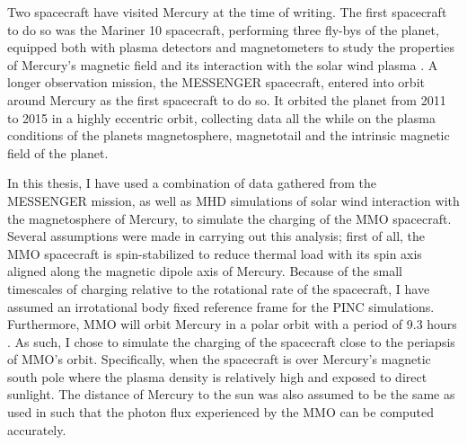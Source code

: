Two spacecraft have visited Mercury at the time of writing. The first spacecraft to do so was the Mariner 10 spacecraft, performing three fly-bys of the planet, equipped both with plasma detectors and magnetometers to study the properties of Mercury's magnetic field and its interaction with the solar wind plasma \parencite{Slavin2012}. A longer observation mission, the MESSENGER spacecraft, entered into orbit around Mercury as the first spacecraft to do so. It orbited the planet from 2011 to 2015 in a highly eccentric orbit, collecting data all the while on the plasma conditions of the planets magnetosphere, magnetotail and the intrinsic magnetic field of the planet.

In this thesis, I have used a combination of data gathered from the MESSENGER mission, as well as MHD simulations of solar wind interaction with the magnetosphere of Mercury, to simulate the charging of the MMO spacecraft. Several assumptions were made in carrying out this analysis; first of all, the MMO spacecraft is spin-stabilized \parencite{Yamakawa2008} to reduce thermal load with its spin axis aligned along the magnetic dipole axis of Mercury. Because of the small timescales of charging relative to the rotational rate of the spacecraft, I have assumed an irrotational body fixed reference frame for the PINC simulations. Furthermore, MMO will orbit Mercury in a polar orbit with a period of 9.3 hours \parencite{ESAa}. As such, I chose to simulate the charging of the spacecraft close to the periapsis of MMO's orbit. Specifically, when the spacecraft is over Mercury's magnetic south pole where the plasma density is relatively high and exposed to direct sunlight. The distance of Mercury to the sun was also assumed to be the same as used in \parencite{Benna2009} such that the photon flux experienced by the MMO can be computed accurately. 

